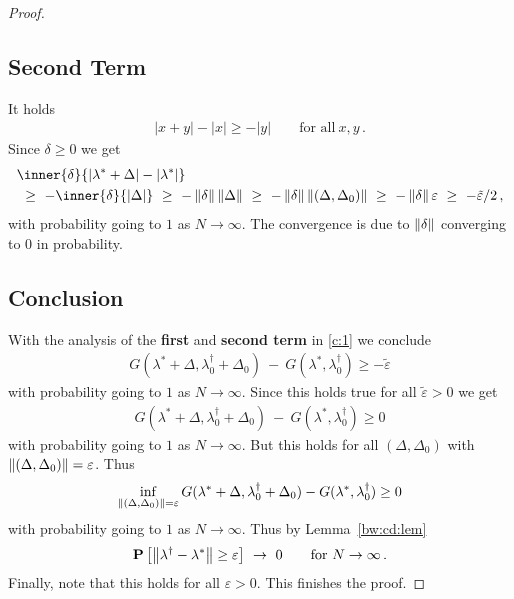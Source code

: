 \begin{proof}
\subsection*{Second Term}
It holds
\begin{gather*}
  |x+y|-|x|\ge
  -|y|
  \qquad
  \text{for all}\ 
  x,y
  \,.
\end{gather*}
Since
$\delta\ge 0$
we get
\begin{align*}
  &
     \inner
     {\delta}
     {
       |\lambda^*+\Delta|
       -
       |\lambda^*|
     }
     \\
     &
     \ 
     \ge
     \ 
     -
     \inner{\delta}
     {|\Delta|}
     \ 
     \ge
     \ 
     -
     \norm{\delta}
     \norm{\Delta}
     \ 
     \ge
     \ 
     -
     \norm{\delta}
     \norm{(\Delta,\Delta_0)}
     \ 
     \ge
     \ 
     -
     \norm{\delta}
     \varepsilon
     \ 
     \ge
     \ 
     -
     \tilde{\varepsilon}/2
     \,,
\end{align*}
with probability going to $1$ as $N\to \infty$.
The convergence is due to $\left\lVert\delta\right\rVert$ converging to $0$ in probability.
\subsection*{Conclusion}
With the analysis of the \textbf{first} and \textbf{second term} in
\eqref{c:1} we conclude
\begin{gather}
  G
     (
     \lambda^*
      +
      \Delta
      ,
      \lambda^\dagger_0
      +
     \Delta_0
     )
     \ 
     -
     \ 
     G
     (
     \lambda^*,
      \lambda^\dagger_0
     )
     \ge
     -
     \tilde{\varepsilon}
\end{gather}
with probability going to $1$ as $N\to \infty$.
Since this holds true for all $\tilde{\varepsilon}>0$ we get
\begin{gather}
  G
     (
     \lambda^*
      +
      \Delta
      ,
      \lambda^\dagger_0
      +
     \Delta_0
     )
     \ 
     -
     \ 
     G
     (
     \lambda^*,
      \lambda^\dagger_0
     )
     \ge
     0
\end{gather}
with probability going to $1$ as $N\to \infty$.
But this holds for all 
$
(\Delta,\Delta_0)
$
with 
$
\left\lVert
(\Delta,\Delta_0)
\right\rVert
=\varepsilon
$. Thus
\begin{gather}
   \inf _ { 
       \left\lVert
         (
     \Delta
     ,
     \Delta_0
         )
 \right\rVert 
= \varepsilon }
     G
     (
     \lambda^*
      +
      \Delta
      ,
      \lambda^\dagger_0
      +
     \Delta_0
     )
     -
     G
     (
     \lambda^*,
      \lambda^\dagger_0
     )
     \ge 
     0
\end{gather}
with probability going to $1$ as $N\to \infty$.
Thus by Lemma~\ref{bw:cd:lem}
\begin{gather}
  \P
    \left[ 
    \norm{
      \lambda^\dagger
      -
      \lambda^*
    }
    \ge
    \varepsilon
    \right]
    \ 
    \to
    \ 
    0
    \qquad
    \text{for}\ 
    N
    \to 
    \infty
    \,.
\end{gather}
Finally, note that this holds for all $\varepsilon>0$. This finishes the proof.
\end{proof}
